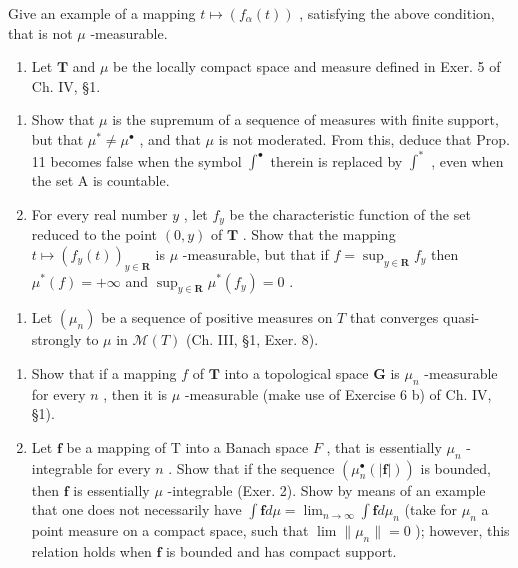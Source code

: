 Give an example of a mapping \(t \mapsto (f_{\alpha}(t))\) , satisfying the above condition, that is not \(\mu\) -measurable.

\begin{enumerate}
\def\labelenumi{\arabic{enumi})}
\setcounter{enumi}{3}
\tightlist
\item
  Let \(\mathbf{T}\) and \(\mu\) be the locally compact space and measure defined in Exer. 5 of Ch. IV, §1.
\end{enumerate}

\begin{enumerate}
\def\labelenumi{\alph{enumi})}
\item
  Show that \(\mu\) is the supremum of a sequence of measures with finite support, but that \(\mu^{*} \neq \mu^{\bullet}\) , and that \(\mu\) is not moderated. From this, deduce that Prop. 11 becomes false when the symbol \(\int^{\bullet}\) therein is replaced by \(\int^{*}\) , even when the set A is countable.
\item
  For every real number \(y\) , let \(f_y\) be the characteristic function of the set reduced to the point \((0, y)\) of \(\mathbf{T}\) . Show that the mapping \(t \mapsto (f_y(t))_{y \in \mathbf{R}}\) is \(\mu\) -measurable, but that if \(f = \sup_{y \in \mathbf{R}} f_y\) then \(\mu^*(f) = +\infty\) and \(\sup_{y \in \mathbf{R}} \mu^*(f_y) = 0\) .
\end{enumerate}

\begin{enumerate}
\def\labelenumi{\arabic{enumi})}
\setcounter{enumi}{4}
\tightlist
\item
  Let \((\mu_n)\) be a sequence of positive measures on \(T\) that converges quasi-strongly to \(\mu\) in \(\mathcal{M}(T)\) (Ch. III, §1, Exer. 8).
\end{enumerate}

\begin{enumerate}
\def\labelenumi{\alph{enumi})}
\item
  Show that if a mapping \(f\) of \(\mathbf{T}\) into a topological space \(\mathbf{G}\) is \(\mu_n\) -measurable for every \(n\) , then it is \(\mu\) -measurable (make use of Exercise 6 b) of Ch. IV, §1).
\item
  Let \(\mathbf{f}\) be a mapping of T into a Banach space \(F\) , that is essentially \(\mu_n\) -integrable for every \(n\) . Show that if the sequence \((\mu_n^\bullet (|\mathbf{f}|))\) is bounded, then \(\mathbf{f}\) is essentially \(\mu\) -integrable (Exer. 2). Show by means of an example that one does not necessarily have \(\int \mathbf{f} d\mu = \lim_{n\to \infty}\int \mathbf{f} d\mu_n\) (take for \(\mu_n\) a point measure on a compact space, such that \(\lim \| \mu_n\| = 0\) ); however, this relation holds when \(\mathbf{f}\) is bounded and has compact support.
\end{enumerate}

